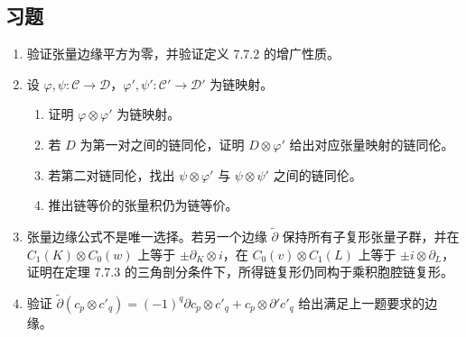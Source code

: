 \subsection*{习题}
\begin{enumerate}
\item 验证张量边缘平方为零，并验证定义 7.7.2 的增广性质。
\item 设 $\varphi,\psi:\mathcal C\to\mathcal D$，$\varphi',\psi':\mathcal C'\to\mathcal D'$ 为链映射。
\begin{enumerate}[label=(\alph*)]
\item 证明 $\varphi\otimes\varphi'$ 为链映射。
\item 若 $D$ 为第一对之间的链同伦，证明 $D\otimes\varphi'$ 给出对应张量映射的链同伦。
\item 若第二对链同伦，找出 $\psi\otimes\varphi'$ 与 $\psi\otimes\psi'$ 之间的链同伦。
\item 推出链等价的张量积仍为链等价。
\end{enumerate}
\item 张量边缘公式不是唯一选择。若另一个边缘 $\widetilde\partial$ 保持所有子复形张量子群，并在 $C_1(K)\otimes C_0(w)$ 上等于 $\pm\partial_K\otimes i$，在 $C_0(v)\otimes C_1(L)$ 上等于 $\pm i\otimes\partial_L$，证明在定理 7.7.3 的三角剖分条件下，所得链复形仍同构于乘积胞腔链复形。
\item 验证 $\widetilde\partial(c_p\otimes c'_q)=(-1)^q\partial c_p\otimes c'_q+c_p\otimes\partial'c'_q$ 给出满足上一题要求的边缘。
\end{enumerate}
